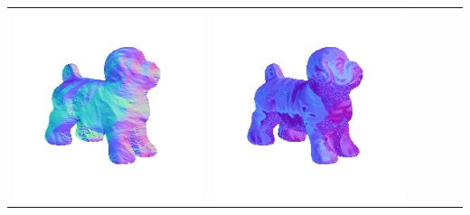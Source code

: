 \begin{tabularx}{\linewidth}{@{}Y@{}Y@{}Y@{}Y@{}Y@{}Y@{}}
\includegraphics[width=\linewidth]{semisynthetic/20160617_17_yu_out.png} &
\includegraphics[width=\linewidth]{semisynthetic/20160617_17_dpsn_out.png} &

\end{tabularx}
